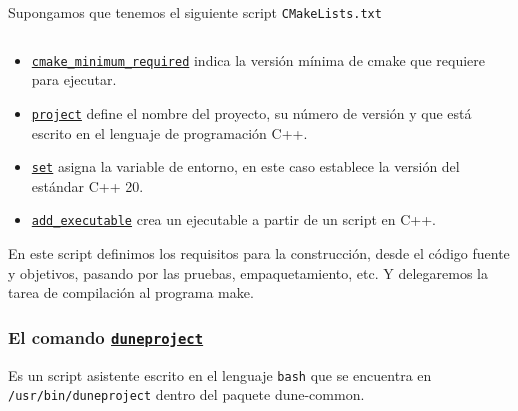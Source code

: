 




\begin{frame}[fragile]
	Supongamos que tenemos el siguiente script \lstinline{CMakeLists.txt}

	\inputminted{cmake}{CMakeList.txt.sample}

	\begin{itemize}
		\item

		\href{https://cmake.org/cmake/help/latest/command/cmake_minimum_required.html}{\lstinline{cmake_minimum_required}}
		indica la versión mínima de cmake que requiere para ejecutar.

		\item
		
		\href{https://cmake.org/cmake/help/latest/command/project.html}{\lstinline{project}}
		define el nombre del proyecto, su número de versión y que
		está escrito en el lenguaje de programación C++.
		
		\item

		\href{https://cmake.org/cmake/help/latest/command/set.html}{\lstinline{set}}
		asigna la variable de entorno, en este caso establece la versión del estándar C++ 20.

		\item

		\href{https://cmake.org/cmake/help/latest/command/add_executable.html}{\lstinline{add_executable}}
		crea un ejecutable a partir de un script en C++.

	\end{itemize}

	En este script definimos los requisitos para la construcción, desde
	el código fuente y objetivos, pasando por las pruebas, empaquetamiento, etc.
	Y delegaremos la tarea de compilación al programa make.

\end{frame}

\begin{frame}
	\frametitle{
		El comando \href{https://gitlab.dune-project.org/core/dune-common/-/raw/master/bin/duneproject}{\lstinline{duneproject}}
	}

	Es un script asistente escrito en el lenguaje \lstinline{bash}
	que se encuentra en \lstinline{/usr/bin/duneproject} dentro del paquete dune-common.
\end{frame}

